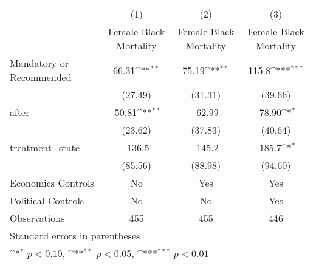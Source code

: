 {
\def\sym#1{\ifmmode^{#1}\else\(^{#1}\)\fi}
\begin{longtable}{l*{3}{c}}
\hline\hline\endfirsthead\hline\endhead\hline\endfoot\endlastfoot
                    &\multicolumn{1}{c}{(1)}&\multicolumn{1}{c}{(2)}&\multicolumn{1}{c}{(3)}\\
                    &\multicolumn{1}{c}{Female Black Mortality}&\multicolumn{1}{c}{Female Black Mortality}&\multicolumn{1}{c}{Female Black Mortality}\\
\hline
Mandatory or Recommended&       66.31\sym{**} &       75.19\sym{**} &       115.8\sym{***}\\
                    &     (27.49)         &     (31.31)         &     (39.66)         \\
[1em]
after               &      -50.81\sym{**} &      -62.99         &      -78.90\sym{*}  \\
                    &     (23.62)         &     (37.83)         &     (40.64)         \\
[1em]
treatment\_state     &      -136.5         &      -145.2         &      -185.7\sym{*}  \\
                    &     (85.56)         &     (88.98)         &     (94.60)         \\
[1em]
Economics Controls  &          No         &         Yes         &         Yes         \\
[1em]
Political Controls  &          No         &          No         &         Yes         \\
\hline
Observations        &         455         &         455         &         446         \\
\hline\hline
\multicolumn{4}{l}{\footnotesize Standard errors in parentheses}\\
\multicolumn{4}{l}{\footnotesize \sym{*} \(p<0.10\), \sym{**} \(p<0.05\), \sym{***} \(p<0.01\)}\\
\end{longtable}
}
